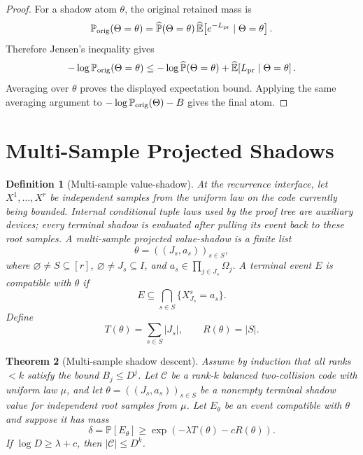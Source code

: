 \documentclass[11pt]{article}
\newtheorem{theorem}{Theorem}[section]
\newtheorem{definition}[theorem]{Definition}
\newcommand{\C}{\mathcal C}
\newcommand{\Prb}{\mathbb P}
\newcommand{\EE}{\mathbb E}
\begin{document}
\begin{proof}
For a shadow atom $\theta$, the original retained mass is
\[
  \Prb_{\rm orig}(\Theta=\theta)
  =
  \widehat{\Prb}(\Theta=\theta)\,
  \widehat{\EE}\!\left[e^{-L_{\rm pr}}\mid \Theta=\theta\right].
\]
Therefore Jensen's inequality gives
\[
  -\log \Prb_{\rm orig}(\Theta=\theta)
  \le
  -\log \widehat{\Prb}(\Theta=\theta)
  +
  \widehat{\EE}\!\left[L_{\rm pr}\mid \Theta=\theta\right].
\]
Averaging over $\theta$ proves the displayed expectation bound.  Applying the
same averaging argument to
$-\log\Prb_{\rm orig}(\Theta)-B$ gives the final atom.
\end{proof}

\section{Multi-Sample Projected Shadows}

\begin{definition}[Multi-sample value-shadow]
\label{def:multi-sample-shadow}
At the recurrence interface, let $X^1,\ldots,X^r$ be independent samples from
the uniform law on the code currently being bounded.  Internal conditional
tuple laws used by the proof tree are auxiliary devices; every terminal shadow
is evaluated after pulling its event back to these root samples.  A
multi-sample projected value-shadow is a finite list
\[
  \theta=((J_s,a_s))_{s\in S},
\]
where $\varnothing\ne S\subseteq [r]$, $\varnothing\ne J_s\subseteq I$, and
$a_s\in\prod_{j\in J_s}\Omega_j$.  A terminal event $E$ is compatible with
$\theta$ if
\[
  E \subseteq \bigcap_{s\in S}\{X^s_{J_s}=a_s\}.
\]
Define
\[
  T(\theta)=\sum_{s\in S}|J_s|,\qquad R(\theta)=|S|.
\]
\end{definition}

\begin{theorem}[Multi-sample shadow descent]
\label{thm:multi-shadow}
Assume by induction that all ranks $<k$ satisfy the bound $B_j\le D^j$.
Let $\C$ be a rank-$k$ balanced two-collision code with uniform law $\mu$, and
let $\theta=((J_s,a_s))_{s\in S}$ be a nonempty terminal shadow value for
independent root samples from $\mu$.  Let $E_\theta$ be an event compatible with
$\theta$ and suppose it has mass
\[
  \delta=\Prb[E_\theta]
  \ge \exp(-\lambda T(\theta)-cR(\theta)).
\]
If $\log D\ge \lambda+c$, then $|\C|\le D^k$.
\end{theorem}
\end{document}
